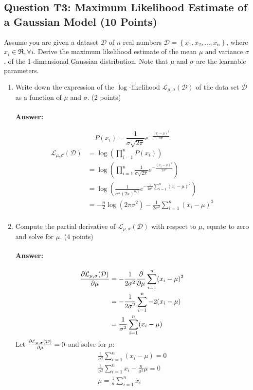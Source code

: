 \documentclass[10pt]{article}
\begin{document}
\pagebreak
\subsection*{Question T3: Maximum Likelihood Estimate of a Gaussian Model (10 Points)}
Assume you are given a dataset $\mathcal{D}$ of $n$ real numbers $\mathcal{D}=\left\{x_{1}, x_{2}, \ldots, x_{n}\right\}$, where $x_{i} \in \Re, \forall i$. Derive the maximum likelihood estimate of the mean $\mu$ and variance $\sigma$, of the 1-dimensional Gaussian distribution. Note that $\mu$ and $\sigma$ are the learnable parameters.

\begin{enumerate}
  \item Write down the expression of the $\log$-likelihood $\mathcal{L}_{\mu, \sigma}(\mathcal{D})$ of the data set $\mathcal{D}$ as a function of $\mu$ and $\sigma$. (2 points)
  \paragraph{Answer:}
  $$P(x_i) = \frac {1}{\sigma {\sqrt {2\pi }}} e^{-\frac {(x_i-\mu )^{2}}{2\sigma ^{2}}}$$
  \begin{align*}
    \mathcal{L}_{\mu, \sigma}(\mathcal{D}) &= \log{\left(\prod_{i=1}^n P(x_i)\right)}\\
    &= \log{\left(\prod_{i=1}^n \frac {1}{\sigma {\sqrt {2\pi }}} e^{-\frac {(x_i-\mu )^{2}}{2\sigma ^{2}}}\right)}\\
    &= \log{\left(\frac {1}{\sigma^n (2\pi)^{n/2}} e^{-\frac{1}{2\sigma^2}\sum_{i=1}^n (x_i-\mu )^{2}}\right)}\\
    &= -\frac{n}{2}\log{(2\pi \sigma^2)}-\frac{1}{2\sigma^2}\sum_{i=1}^n (x_i-\mu )^{2}\\
  \end{align*}

  \item Compute the partial derivative of $\mathcal{L}_{\mu, \sigma}(\mathcal{D})$ with respect to $\mu$, equate to zero and solve for $\mu$. (4 points)
  \paragraph{Answer:}
  \begin{align*}
    \pdv{\mathcal{L}_{\mu, \sigma}(\mathcal{D})}{\mu } &= -\frac{1}{2\sigma^2}\pdv{}{\mu}\sum_{i=1}^n (x_i-\mu )^{2} \\
    &= -\frac{1}{2\sigma^2}\sum_{i=1}^n -2(x_i-\mu ) \\
    &= \frac{1}{\sigma^2} \sum^n_{i=1} (x_i-\mu) \\
  \end{align*}
  Let $\pdv{\mathcal{L}_{\mu, \sigma}(\mathcal{D})}{\mu }=0$ and solve for $\mu$:
  \begin{align*}
    \frac{1}{\sigma^2} \sum^n_{i=1} (x_i-\mu) = 0\\
    \frac{1}{\sigma^2} \sum^n_{i=1} x_i - \frac{n}{\sigma^2} \mu = 0\\
    \mu = \frac{1}{n} \sum^n_{i=1} x_i\\
  \end{align*}



\end{enumerate}
\end{document}
